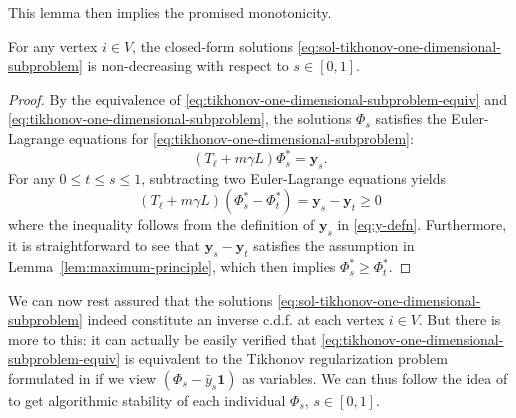 \documentclass[letterpaper]{article} %
\begin{document}
This lemma then implies the promised monotonicity.  
\begin{proposition}\label{Propo:Non_Decreasing}
  For any vertex $i\in V$, the closed-form solutions \eqref{eq:sol-tikhonov-one-dimensional-subproblem} is non-decreasing with respect to $s\in \left[ 0,1 \right]$.
\end{proposition}
\begin{proof}
  By the equivalence of \eqref{eq:tikhonov-one-dimensional-subproblem-equiv} and \eqref{eq:tikhonov-one-dimensional-subproblem}, the solutions $\Phi_s$ satisfies the Euler-Lagrange equations for \eqref{eq:tikhonov-one-dimensional-subproblem}:
  \begin{equation*}
    \left( T_{\ell}+m\gamma L \right)\Phi_s^{*}=\mathbf{y}_s.
  \end{equation*}
  For any $0\leq t\leq s\leq 1$, subtracting two Euler-Lagrange equations yields
  \begin{equation*}
    \left( T_{\ell}+m\gamma L \right)\left(\Phi_s^{*}-\Phi_t^{*}\right)=\mathbf{y}_s-\mathbf{y}_t\geq 0
  \end{equation*}
  where the inequality follows from the definition of $\mathbf{y}_s$ in \eqref{eq:y-defn}. Furthermore, it is straightforward to see that $\mathbf{y}_s-\mathbf{y}_t$ satisfies the assumption in Lemma~\ref{lem:maximum-principle}, which then implies $\Phi_s^{*}\geq \Phi_t^{*}$.
\end{proof}

We can now rest assured that the solutions \eqref{eq:sol-tikhonov-one-dimensional-subproblem} indeed constitute an inverse c.d.f. at each vertex $i\in V$. But there is more to this: it can actually be easily verified that \eqref{eq:tikhonov-one-dimensional-subproblem-equiv} is equivalent to the Tikhonov regularization problem formulated in \cite{Belkin2004} if we view $\left(\Phi_s-\bar{y}_s\mathbf{1}\right)$ as variables. We can thus follow the idea of \cite[Theorem 5]{Belkin2004} to get algorithmic stability of each individual $\Phi_s$, $s\in \left[ 0,1 \right]$.
\end{document}
